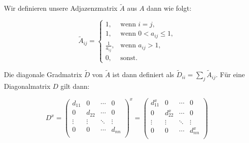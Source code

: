 \documentclass{scrartcl}
\begin{document}
Wir definieren unsere Adjazenzmatrix $\tilde A$ aus $A$ dann wie folgt:

\begin{equation}
  \tilde A_{ij} = \begin{cases}
    1, & \text{wenn }i=j\text{,}\\
    1, & \text{wenn }0 < a_{ij} \leq 1\text{,}\\
    \frac{1}{a_{ij}}, & \text{wenn }a_{ij} > 1\text{,}\\
    0, & \text{sonst.}
  \end{cases}
\end{equation}


Die diagonale Gradmatrix $\tilde D$ von $\tilde A$ ist dann definiert als $\tilde D_{ii} = \sum_j \tilde A_{ij}$.
Für eine Diagonalmatrix $D$ gilt dann:

\begin{equation}
  D^x = \begin{pmatrix}
    d_{11} & 0 & \cdots & 0\\
    0 & d_{22} & \cdots & 0\\
    \vdots & \vdots & \ddots & \vdots\\
    0 & 0 & \cdots & d_{nn}\\
  \end{pmatrix}^x = \begin{pmatrix}
    d_{11}^x & 0 & \cdots & 0\\
    0 & d_{22}^x & \cdots & 0\\
    \vdots & \vdots & \ddots & \vdots\\
    0 & 0 & \cdots & d_{nn}^x\\
  \end{pmatrix}
\end{equation}
\end{document}

